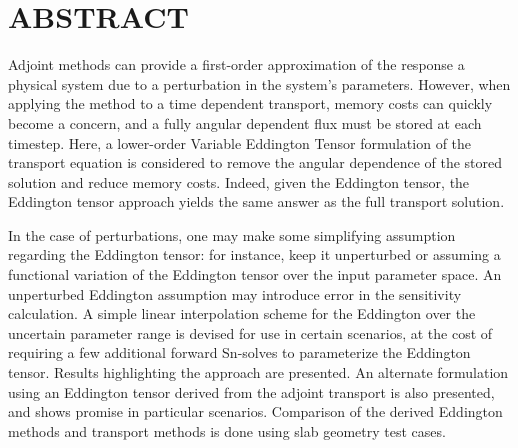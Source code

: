 
\chapter*{ABSTRACT}

\pagestyle{plain} %
\setcounter{page}{2}

Adjoint methods can provide a first-order approximation of the response a physical system due to a perturbation in the system's parameters. However, when applying the method to a time dependent transport, memory costs can quickly become a concern, and a fully angular dependent flux must be stored at each timestep. Here, a lower-order Variable Eddington Tensor formulation of the transport equation is considered to remove the angular dependence of the stored solution and reduce memory costs. Indeed, given the Eddington tensor, the Eddington tensor approach yields the same answer as the full transport solution.

In the case of perturbations, one may make some simplifying assumption regarding the Eddington tensor: for instance, keep it unperturbed or assuming a functional variation of the Eddington tensor over the input parameter space. An unperturbed Eddington assumption may introduce error in the sensitivity calculation. A simple linear interpolation scheme for the Eddington over the uncertain parameter range is devised for use in certain scenarios, at the cost of requiring a few additional forward Sn-solves to parameterize the Eddington tensor. Results highlighting the approach are presented. An alternate formulation using an Eddington tensor derived from the adjoint transport is also presented, and shows promise in particular scenarios. Comparison of the derived Eddington methods and transport methods is done using slab geometry test cases.


 

\pagebreak{}
